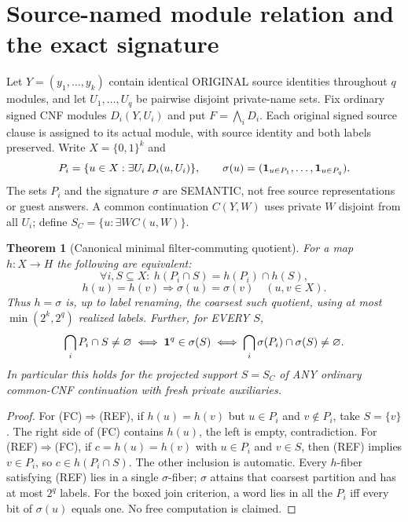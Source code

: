 \documentclass[11pt]{article}
\newtheorem{theorem}{Theorem}
\begin{document}
\section{Source-named module relation and the exact signature}
Let $Y=(y_1,\ldots,y_k)$ contain identical ORIGINAL source identities
throughout $q$ modules, and let $U_1,\ldots,U_q$ be pairwise disjoint
private-name sets. Fix ordinary signed CNF modules $D_i(Y,U_i)$ and
put $F=\bigwedge_iD_i$. Each original signed source clause is assigned to
its actual module, with source identity and both labels preserved. Write
$X=\{0,1\}^k$ and
\[
P_i=\{u\in X:\exists U_i\,D_i(u,U_i)\},\qquad
\sigma(u)=({\bf1}_{u\in P_1},\ldots,{\bf1}_{u\in P_q}).
\]
The sets $P_i$ and the signature $\sigma$ are SEMANTIC, not free source
representations or guest answers. A common continuation $C(Y,W)$ uses
private $W$ disjoint from all $U_i$; define $S_C=\{u:\exists W C(u,W)\}$.

\begin{theorem}[Canonical minimal filter-commuting quotient]
For a map $h:X\to H$ the following are equivalent:
\[
\forall i,S\subseteq X:\ h(P_i\cap S)=h(P_i)\cap h(S), \tag{FC}
\]
\[
h(u)=h(v)\Longrightarrow \sigma(u)=\sigma(v)\quad(u,v\in X). \tag{REF}
\]
Thus $h=\sigma$ is, up to label renaming, the coarsest such quotient,
using at most $\min(2^k,2^q)$ realized labels. Further, for EVERY $S$,
\[
\bigcap_iP_i\cap S\ne\varnothing
\iff {\bf1}^{q}\in\sigma(S)
\iff \bigcap_i\sigma(P_i)\cap\sigma(S)\ne\varnothing .
\]
In particular this holds for the projected support $S=S_C$ of ANY
ordinary common-CNF continuation with fresh private auxiliaries.
\end{theorem}
\begin{proof}
For (FC)$\Rightarrow$(REF), if $h(u)=h(v)$ but $u\in P_i$ and
$v\notin P_i$, take $S=\{v\}$. The right side of (FC)
contains $h(u)$, the left is empty, contradiction.
For (REF)$\Rightarrow$(FC), if $c=h(u)=h(v)$ with $u\in P_i$
and $v\in S$, then (REF) implies $v\in P_i$, so
$c\in h(P_i\cap S)$. The other inclusion is automatic.
Every $h$-fiber satisfying (REF) lies in a single $\sigma$-fiber;
$\sigma$ attains that coarsest partition and has at most $2^q$ labels.
For the boxed join criterion, a word lies in all the $P_i$ iff
every bit of $\sigma(u)$ equals one. No free computation is claimed.
\end{proof}
\end{document}
